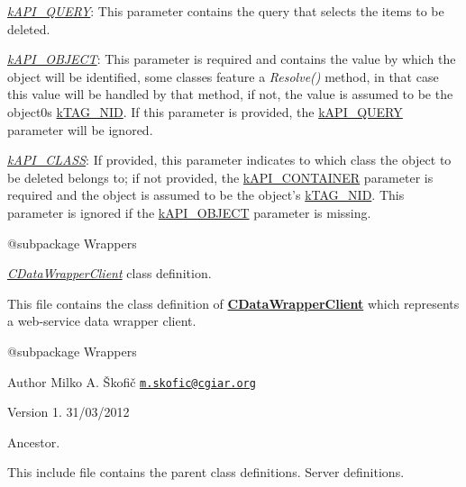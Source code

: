 \begin{DoxyItemize}
\begin{DoxyItemize}
\begin{DoxyItemize}
\item {\itshape \hyperlink{}{k\-A\-P\-I\-\_\-\-Q\-U\-E\-R\-Y}}\-: This parameter contains the query that selects the items to be deleted. 
\item {\itshape \hyperlink{}{k\-A\-P\-I\-\_\-\-O\-B\-J\-E\-C\-T}}\-: This parameter is required and contains the value by which the object will be identified, some classes feature a {\itshape Resolve()} method, in that case this value will be handled by that method, if not, the value is assumed to be the object0s \hyperlink{}{k\-T\-A\-G\-\_\-\-N\-I\-D}. If this parameter is provided, the \hyperlink{}{k\-A\-P\-I\-\_\-\-Q\-U\-E\-R\-Y} parameter will be ignored. 
\item {\itshape \hyperlink{}{k\-A\-P\-I\-\_\-\-C\-L\-A\-S\-S}}\-: If provided, this parameter indicates to which class the object to be deleted belongs to; if not provided, the \hyperlink{}{k\-A\-P\-I\-\_\-\-C\-O\-N\-T\-A\-I\-N\-E\-R} parameter is required and the object is assumed to be the object's \hyperlink{}{k\-T\-A\-G\-\_\-\-N\-I\-D}. This parameter is ignored if the \hyperlink{}{k\-A\-P\-I\-\_\-\-O\-B\-J\-E\-C\-T} parameter is missing. 
\end{DoxyItemize}
\end{DoxyItemize}
\end{DoxyItemize}

\begin{DoxyVerb} @subpackage        Wrappers\end{DoxyVerb}


{\itshape \hyperlink{class_c_data_wrapper_client}{C\-Data\-Wrapper\-Client}} class definition.

This file contains the class definition of {\bfseries \hyperlink{class_c_data_wrapper_client}{C\-Data\-Wrapper\-Client}} which represents a web-\/service data wrapper client.

\begin{DoxyVerb} @subpackage        Wrappers
\end{DoxyVerb}


\begin{DoxyAuthor}{Author}
Milko A. Škofič \href{mailto:m.skofic@cgiar.org}{\tt m.\-skofic@cgiar.\-org} 
\end{DoxyAuthor}
\begin{DoxyVersion}{Version}
1. 31/03/2012
\end{DoxyVersion}
Ancestor.

This include file contains the parent class definitions. Server definitions.

